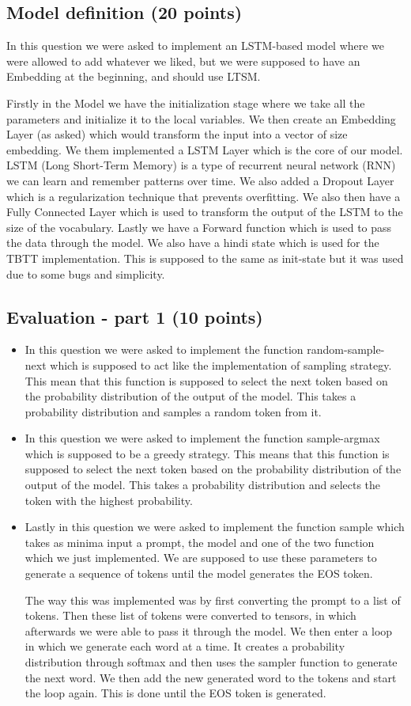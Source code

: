 \documentclass[a4paper]{article}
\begin{document}
\subsection{Model definition (20 points)}
In this question we were asked to implement an LSTM-based model where we were allowed to add whatever we liked, but we were supposed to have an Embedding at the beginning, and should use LTSM.

Firstly in the Model we have the initialization stage where we take all the parameters and initialize it to the local variables. We then create an Embedding Layer (as asked) which would transform the input into a vector of size embedding. We them implemented a LSTM Layer which is the core of our model. LSTM (Long Short-Term Memory) is a type of recurrent neural network (RNN) we can learn and remember patterns over time. We also added a Dropout Layer which is a regularization technique that prevents overfitting. We also then have a Fully Connected Layer which is used to transform the output of the LSTM to the size of the vocabulary. Lastly we have a Forward function which is used to pass the data through the model. We also have a hindi state which is used for the TBTT implementation. This is supposed to the same as init-state but it was used due to some bugs and simplicity.

\subsection{Evaluation - part 1 (10 points)}
\begin{itemize}
    \item In this question we were asked to implement the function random-sample-next which is supposed to act like the implementation of sampling strategy. This mean that this function is supposed to select the next token based on the probability distribution of the output of the model. This takes a probability distribution and samples a random token from it.
    \item In this question we were asked to implement the function sample-argmax which is supposed to be a greedy strategy. This means that this function is supposed to select the next token based on the probability distribution of the output of the model. This takes a probability distribution and selects the token with the highest probability.
    \item Lastly in this question we were asked to implement the function sample which takes as minima input a prompt, the model and one of the two function which we just implemented. We are supposed to use these parameters to generate a sequence of tokens until the model generates the EOS token.

          The way this was implemented was by first converting the prompt to a list of tokens. Then these list of tokens were converted to tensors, in which afterwards we were able to pass it through the model. We then enter a loop in which we generate each word at a time. It creates a probability distribution through softmax and then uses the sampler function to generate the next word. We then add the new generated word to the tokens and start the loop again. This is done until the EOS token is generated.
\end{itemize}
\end{document}
